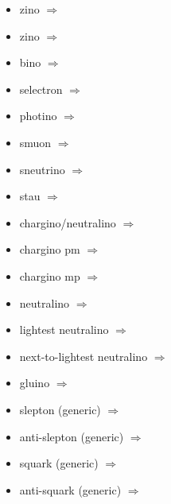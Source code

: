 \begin{multicols}{2}
{\begin{itemize}
\item zino\newline {} $\Rightarrow$ \PSZ
\item zino\newline {} $\Rightarrow$ \PSZz
\item bino\newline {} $\Rightarrow$ \PSB
\item selectron\newline {} $\Rightarrow$ \PSe
\item photino\newline {} $\Rightarrow$ \PSgg
\item smuon\newline {} $\Rightarrow$ \PSgm
\item sneutrino\newline {} $\Rightarrow$ \PSgn
\item stau\newline {} $\Rightarrow$ \PSgt
\item chargino/neutralino\newline {} $\Rightarrow$ \PSgx
\item chargino pm\newline {} $\Rightarrow$ \PSgxpm
\item chargino mp\newline {} $\Rightarrow$ \PSgxmp
\item neutralino\newline {} $\Rightarrow$ \PSgxz
\item lightest neutralino\newline {} $\Rightarrow$ \PSgxzi
\item next-to-lightest neutralino\newline {} $\Rightarrow$ \PSgxzii
\item gluino\newline {} $\Rightarrow$ \PSg
\item slepton (generic)\newline {} $\Rightarrow$ \PSl
\item anti-slepton (generic)\newline {} $\Rightarrow$ \PaSl
\item squark (generic)\newline {} $\Rightarrow$ \PSq
\item anti-squark (generic)\newline {} $\Rightarrow$ \PaSq

\end{itemize}}
\end{multicols}
